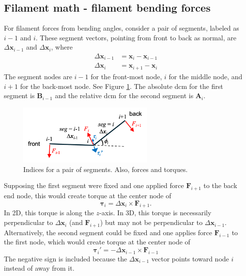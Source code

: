 \documentclass {scrbook}
\begin{document}
\subsection{Filament math - filament bending forces}
\label{sect:FilMathBending}

For filament forces from bending angles, consider a pair of segments, labeled as $i-1$ and $i$. These segment vectors, pointing from front to back as normal, are $\Delta \bm{x}_{i-1}$ and $\Delta \bm{x}_i$, where
\begin{align}
\Delta \bm{x}_{i-1} &= \bm{x}_i - \bm{x}_{i-1} \nonumber \\
\Delta \bm{x}_{i} &= \bm{x}_{i+1} - \bm{x}_{i}
\end{align}
The segment nodes are $i-1$ for the front-most node, $i$ for the middle node, and $i+1$ for the back-most node. See Figure \ref{fig:SegmentPair}. The absolute dcm for the first segment is $\bm{B}_{i-1}$ and the relative dcm for the second segment is $\bm{A}_i$.

\begin{figure}[h]
\centering
\includegraphics[height=3cm]{figures/SegmentPair.png}
\caption{Indices for a pair of segments. Also, forces and torques.}
\label{fig:SegmentPair}
\end{figure}

Supposing the first segment were fixed and one applied force $\bm{F}_{i+1}$ to the back end node, this would create torque at the center node of
\begin{equation}
\bm{\tau}_{i} = \Delta \bm{x}_i \times \bm{F}_{i+1}.
\label{eq:torque}
\end{equation}
In 2D, this torque is along the $z$-axis. In 3D, this torque is necessarily perpendicular to $\Delta \bm{x}_i$ (and $\bm{F}_{i+1}$) but may not be perpendicular to $\Delta \bm{x}_{i-1}$. Alternatively, the second segment could be fixed and one applies force $\bm{F}_{i-1}$ to the first node, which would create torque at the center node of
\begin{equation}
\bm{\tau}_{i}' = -\Delta \bm{x}_{i-1} \times \bm{F}_{i-1}
\label{eq:torque2}
\end{equation}
The negative sign is included because the $\Delta \bm{x}_{i-1}$ vector points toward node $i$ instead of away from it.
\end{document}
